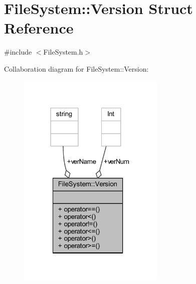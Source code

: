 \hypertarget{struct_file_system_1_1_version}{}\section{File\+System\+:\+:Version Struct Reference}
\label{struct_file_system_1_1_version}


{\ttfamily \#include $<$File\+System.\+h$>$}



Collaboration diagram for File\+System\+:\+:Version\+:
\nopagebreak
\begin{figure}[H]
\begin{center}
\leavevmode
\includegraphics[width=199pt]{struct_file_system_1_1_version__coll__graph}
\end{center}
\end{figure}
